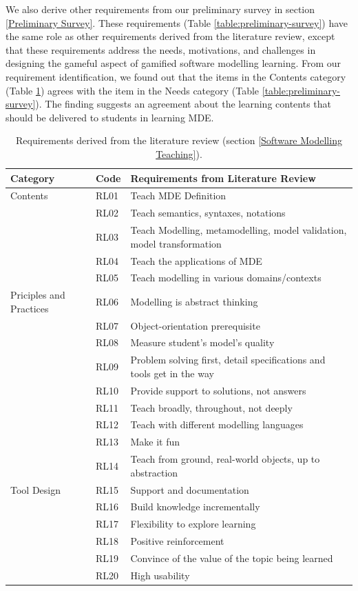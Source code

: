 \documentclass[12pt, a4paper]{report}
\begin{document}
We also derive other requirements from our preliminary survey in section \ref{Preliminary Survey}. These requirements (Table \ref{table:preliminary-survey}) have the same role as other requirements derived from the literature review, except that these requirements address the needs, motivations, and challenges in designing the gameful aspect of gamified software modelling learning. From our requirement identification, we found out that the items in the Contents category (Table \ref{table:requirements}) agrees with the item in the Needs category (Table \ref{table:preliminary-survey}). The finding suggests an agreement about the learning contents that should be delivered to students in learning MDE.

\begin{table}[ht]\caption{Requirements derived from the literature review (section \ref{Software Modelling Teaching}).}
\label{table:requirements}
\begin{center}
\begin{tabular}{ p{2cm}p{1cm}p{10cm} } 
\hline
Category & Code & Requirements from Literature Review \\
\hline
\multirow{1}{2cm}{Contents} 
& RL01 & Teach MDE Definition \\ 
& RL02 & Teach semantics, syntaxes, notations \\ 
& RL03 & Teach Modelling, metamodelling, model validation, model transformation\\
& RL04 & Teach the applications of MDE \\
& RL05 & Teach modelling in various domains/contexts \\

\hline
\multirow{1}{2cm}{Priciples and Practices} 
& RL06 & Modelling is abstract thinking \\ 
& RL07 & Object-orientation prerequisite \\
& RL08 & Measure student's model's quality \\
& RL09 & Problem solving first, detail specifications and tools get in the way \\
& RL10 & Provide support to solutions, not answers \\ 
& RL11 & Teach broadly, throughout, not deeply \\
& RL12 & Teach with different modelling languages \\ 
& RL13 & Make it fun \\ 
& RL14 & Teach from ground, real-world objects, up to abstraction \\ 

\hline
\multirow{1}{2cm}{Tool Design}
& RL15 & Support and documentation \\
& RL16 & Build knowledge incrementally \\
& RL17 & Flexibility to explore learning \\
& RL18 & Positive reinforcement \\
& RL19 & Convince of the value of the topic being learned \\ 
& RL20 & High usability \\ 
\hline
\end{tabular}
\end{center}
\end{table}
\end{document}
